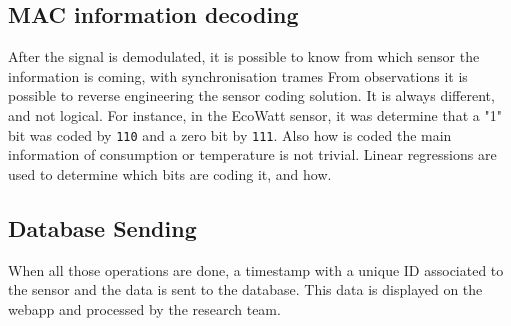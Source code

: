 \subsection{MAC information decoding}
After the signal is demodulated, it is possible to know from which sensor the information is coming, with synchronisation trames
From observations it is possible to reverse engineering the sensor coding solution. It is always different, and not logical. For instance, in the EcoWatt sensor, it was determine that a "1" bit was coded by \texttt{110} and a zero bit by \texttt{111}. Also how is coded the main information of consumption or temperature is not trivial. Linear regressions are used to determine which bits are coding it, and how.

\subsection{Database Sending}
When all those operations are done, a timestamp with a unique ID associated to the sensor and the data is sent to the database. This data is displayed on the webapp and processed by the research team.
